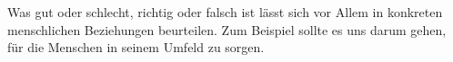 Was gut oder schlecht, richtig oder falsch ist lässt sich vor Allem in konkreten menschlichen Beziehungen beurteilen.
Zum Beispiel sollte es uns darum gehen, für die Menschen in seinem Umfeld zu sorgen.